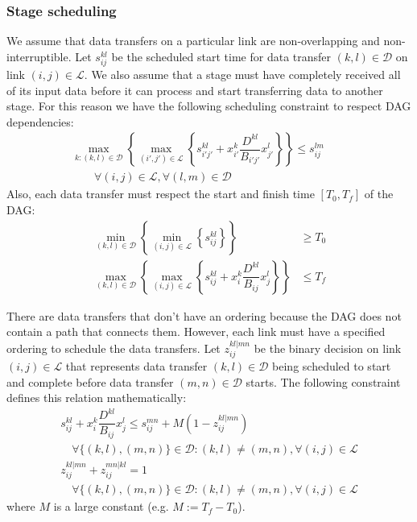 \subsubsection*{Stage scheduling}

We assume that data transfers on a particular link are non-overlapping and non-interruptible.
Let $s_{ij}^{kl}$ be the scheduled start time for data transfer $(k,l)\in\mathcal{D}$ on link $(i,j)\in\mathcal{L}$.
We also assume that a stage must have completely received all of its input data before it can process and start transferring data to another stage.
For this reason we have the following scheduling constraint to respect DAG dependencies:
\begin{align}
	 \max_{k:(k,l)\in\mathcal{D}}\left\{\max_{(i',j')\in\mathcal{L}}\left\{s_{i'j'}^{kl}+x_{i'}^k\dfrac{D^{kl}}{B_{i'j'}}x_{j'}^l\right\}\right\} \leq s_{ij}^{lm}  \quad\quad \nonumber \\
	 \quad\quad \forall(i,j)\in\mathcal{L},\forall(l,m)\in\mathcal{D} \label{eq:DAG_stage_start}
\end{align}
Also, each data transfer must respect the start and finish time $[T_0,T_f]$ of the DAG:
\begin{subequations}\label{eq:DAG_deadline}
	\begin{align}
		\min_{(k,l)\in\mathcal{D}}\left\{\min_{(i,j)\in\mathcal{L}}\left\{s_{ij}^{kl}\right\}\right\} & \geq T_0 \\
		\max_{(k,l)\in\mathcal{D}}\left\{\max_{(i,j)\in\mathcal{L}}\left\{s_{ij}^{kl}+x_{i}^k\dfrac{D^{kl}}{B_{ij}}x_{j}^l\right\}\right\} & \leq T_f
	\end{align}
\end{subequations}

There are data transfers that don't have an ordering because the DAG does not contain a path that connects them.
However, each link must have a specified ordering to schedule the data transfers.
Let $z_{ij}^{kl|mn}$ be the binary decision on link $(i,j)\in\mathcal{L}$ that represents data transfer $(k,l)\in\mathcal{D}$ being scheduled to start and complete before data transfer $(m,n)\in\mathcal{D}$ starts.
The following constraint defines this relation mathematically:
\begin{subequations}\label{eq:DAG_data_trans_start}
	\begin{align}
		s_{ij}^{kl}+x_{i}^k\dfrac{D^{kl}}{B_{ij}}x_{j}^l \leq s_{ij}^{mn} + M(1-z_{ij}^{kl|mn}) \quad \nonumber \\
		\quad\forall \{(k,l),(m,n)\} \in\mathcal{D}:(k,l)\neq(m,n), \forall(i,j)\in\mathcal{L}\\
		z_{ij}^{kl|mn} + z_{ij}^{mn|kl} = 1 \quad \nonumber\\
		\quad\forall \{(k,l),(m,n)\} \in\mathcal{D}:(k,l)\neq(m,n), \forall(i,j)\in\mathcal{L}
	\end{align}
\end{subequations}
where $M$ is a large constant (e.g. $M:=T_f-T_0$).



